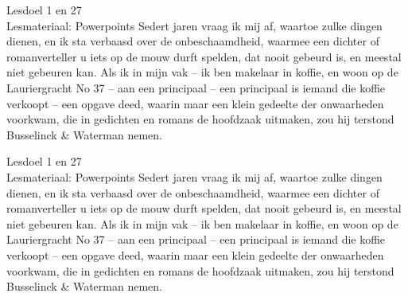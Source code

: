 \begin{lesdeel}{
    Lesdoel 1 en 27 \\
    Lesmateriaal: Powerpoints
}
    Sedert jaren vraag ik mij af, waartoe zulke dingen dienen, en ik sta verbaasd over de onbeschaamdheid, waarmee een dichter of romanverteller u iets op de mouw durft spelden, dat nooit gebeurd is, en meestal niet gebeuren kan.
    Als ik in mijn vak -- ik ben makelaar in koffie, en woon op de Lauriergracht No 37 -- aan een principaal -- een principaal is iemand die koffie verkoopt -- een opgave deed, waarin maar een klein gedeelte der onwaarheden voorkwam, die in gedichten en romans de hoofdzaak uitmaken, zou hij terstond Busselinck \& Waterman nemen.
\end{lesdeel}%
\begin{lesdeel}{
    Lesdoel 1 en 27 \\
    Lesmateriaal: Powerpoints
}
    Sedert jaren vraag ik mij af, waartoe zulke dingen dienen, en ik sta verbaasd over de onbeschaamdheid, waarmee een dichter of romanverteller u iets op de mouw durft spelden, dat nooit gebeurd is, en meestal niet gebeuren kan.
    Als ik in mijn vak -- ik ben makelaar in koffie, en woon op de Lauriergracht No 37 -- aan een principaal -- een principaal is iemand die koffie verkoopt -- een opgave deed, waarin maar een klein gedeelte der onwaarheden voorkwam, die in gedichten en romans de hoofdzaak uitmaken, zou hij terstond Busselinck \& Waterman nemen.
\end{lesdeel}%